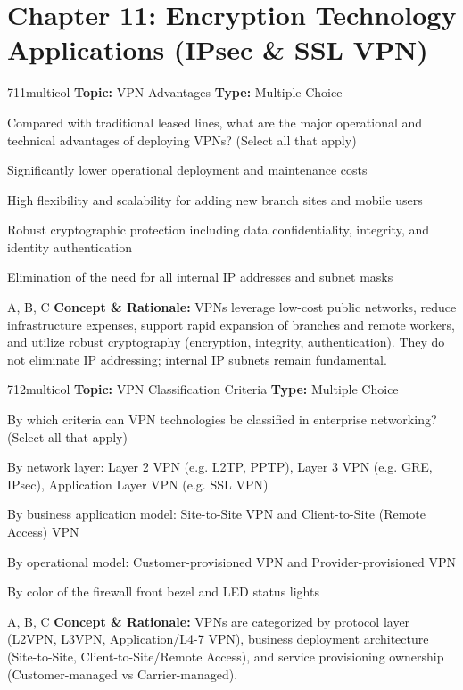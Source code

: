 \section{Chapter 11: Encryption Technology Applications (IPsec \& SSL VPN)}

\begin{qcard}{711}{multicol}
\textcolor{darkslate!75}{\small\textbf{Topic:} VPN Advantages \hfill \textbf{Type:} Multiple Choice}\vspace{0.4em}\par
Compared with traditional leased lines, what are the major operational and technical advantages of deploying VPNs? (Select all that apply)
\begin{qoptions}
\item Significantly lower operational deployment and maintenance costs
\item High flexibility and scalability for adding new branch sites and mobile users
\item Robust cryptographic protection including data confidentiality, integrity, and identity authentication
\item Elimination of the need for all internal IP addresses and subnet masks
\end{qoptions}
\end{qcard}
\nopagebreak
\begin{explainbox}{A, B, C}
\textbf{Concept \& Rationale:} VPNs leverage low-cost public networks, reduce infrastructure expenses, support rapid expansion of branches and remote workers, and utilize robust cryptography (encryption, integrity, authentication). They do not eliminate IP addressing; internal IP subnets remain fundamental.
\end{explainbox}

\begin{qcard}{712}{multicol}
\textcolor{darkslate!75}{\small\textbf{Topic:} VPN Classification Criteria \hfill \textbf{Type:} Multiple Choice}\vspace{0.4em}\par
By which criteria can VPN technologies be classified in enterprise networking? (Select all that apply)
\begin{qoptions}
\item By network layer: Layer 2 VPN (e.g. L2TP, PPTP), Layer 3 VPN (e.g. GRE, IPsec), Application Layer VPN (e.g. SSL VPN)
\item By business application model: Site-to-Site VPN and Client-to-Site (Remote Access) VPN
\item By operational model: Customer-provisioned VPN and Provider-provisioned VPN
\item By color of the firewall front bezel and LED status lights
\end{qoptions}
\end{qcard}
\nopagebreak
\begin{explainbox}{A, B, C}
\textbf{Concept \& Rationale:} VPNs are categorized by protocol layer (L2VPN, L3VPN, Application/L4-7 VPN), business deployment architecture (Site-to-Site, Client-to-Site/Remote Access), and service provisioning ownership (Customer-managed vs Carrier-managed).
\end{explainbox}

